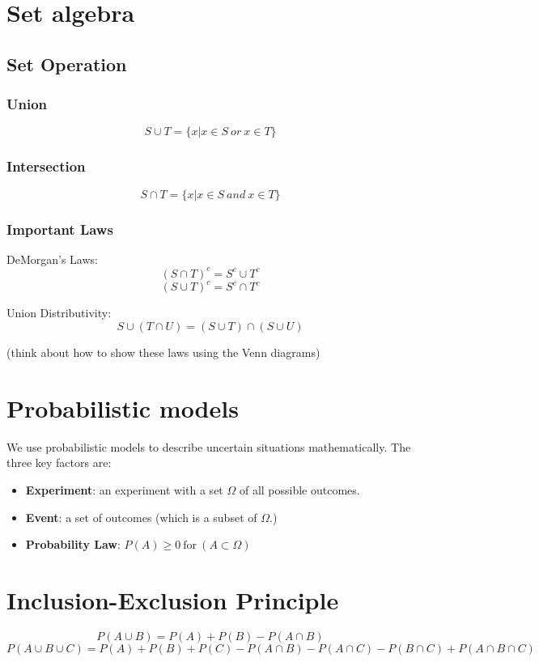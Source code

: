 \documentclass[11pt]{article}
\begin{document}
\section{Set algebra}
\subsection{Set Operation}
\subsubsection{Union}
$$ S \cup T =  \{ x | x \in S \: or \: x \in T \}$$

\subsubsection{Intersection}
$$ S \cap T =  \{ x | x \in S \: and \: x \in T\}$$

\subsubsection{Important Laws}
DeMorgan's Laws:
$$(S \cap T)^{c} = S^{c} \cup T^{c}$$
$$(S \cup T)^{c} = S^{c} \cap T^{c}$$

\noindent Union Distributivity:
$$S \cup (T \cap U) = (S \cup T) \cap (S \cup U) $$

\noindent (think about how to show these laws using the Venn diagrams)

\section{Probabilistic models}
We use probabilistic models to describe uncertain situations mathematically. The three key factors are:
\begin{itemize}
  \item \textbf{Experiment}: an experiment with a set $\Omega$ of all possible outcomes.
  \item \textbf{Event}: a set of outcomes (which is a subset of $\Omega$.)
  \item \textbf{Probability Law}: $P(A) \geq 0 \: \text{for} \: ( A \subset \Omega)$
\end{itemize}

\section{Inclusion-Exclusion Principle}
$$P(A \cup B) = P(A) + P(B) - P(A \cap B)$$
$$P(A \cup B \cup C) = P(A) + P(B) + P(C) - P(A \cap B) - P(A \cap C) - P(B \cap C) + P(A \cap B \cap C)$$
\end{document}
